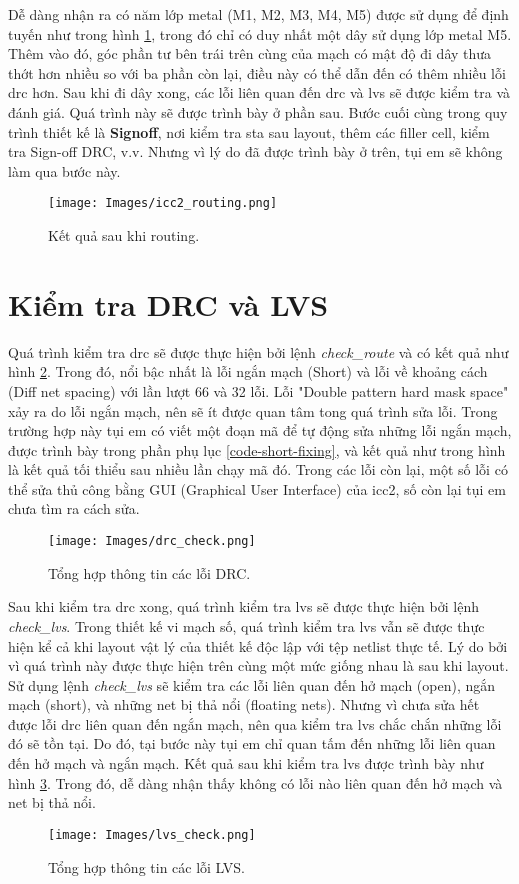 Dễ dàng nhận ra có năm lớp metal (M1, M2, M3, M4, M5) được sử dụng để định tuyến như trong hình \ref{fig:icc2-routing}, trong đó chỉ có duy nhất một dây sử dụng lớp metal M5. Thêm vào đó, góc phần tư bên trái trên cùng của mạch có mật độ đi dây thưa thớt hơn nhiều so với ba phần còn lại, điều này có thể dẫn đến có thêm nhiều lỗi \acrshort{drc} hơn. Sau khi đi dây xong, các lỗi liên quan đến \acrshort{drc} và \acrshort{lvs} sẽ được kiểm tra và đánh giá. Quá trình này sẽ được trình bày ở phần sau. Bước cuối cùng trong quy trình thiết kế là \textbf{Signoff}, nơi kiểm tra \acrshort{sta} sau layout, thêm các filler cell, kiểm tra Sign-off DRC, v.v. Nhưng vì lý do đã được trình bày ở trên, tụi em sẽ không làm qua bước này.

\begin{figure}[htp]
\centering
\captionsetup{justification=centering,margin=2cm}
\texttt{[image: Images/icc2\_routing.png]}
\caption{Kết quả sau khi routing.}
\label{fig:icc2-routing}
\end{figure}

\section{Kiểm tra DRC và LVS}

Quá trình kiểm tra \acrshort{drc} sẽ được thực hiện bởi lệnh \textit{check\_route} và có kết quả như hình \ref{fig:drc-check}. Trong đó, nổi bậc nhất là lỗi ngắn mạch (Short) và lỗi về khoảng cách (Diff net spacing) với lần lượt 66 và 32 lỗi. Lỗi "Double pattern hard mask space" xảy ra do lỗi ngắn mạch, nên sẽ ít được quan tâm tong quá trình sửa lỗi. Trong trường hợp này tụi em có viết một đoạn mã để tự động sửa những lỗi ngắn mạch, được trình bày trong phần phụ lục \ref{code-short-fixing}, và kết quả như trong hình là kết quả tối thiểu sau nhiều lần chạy mã đó. Trong các lỗi còn lại, một số lỗi có thể sửa thủ công bằng GUI (Graphical User Interface) của \acrshort{icc2}, số còn lại tụi em chưa tìm ra cách sửa.

\begin{figure}[htp]
\centering
\captionsetup{justification=centering,margin=2cm}
\texttt{[image: Images/drc\_check.png]}
\caption{Tổng hợp thông tin các lỗi DRC.}
\label{fig:drc-check}
\end{figure}

Sau khi kiểm tra \acrshort{drc} xong, quá trình kiểm tra \acrshort{lvs} sẽ được thực hiện bởi lệnh \textit{check\_lvs}. Trong thiết kế vi mạch số, quá trình kiểm tra \acrshort{lvs} vẫn sẽ được thực hiện kể cả khi layout vật lý của thiết kế độc lập với tệp netlist thực tế. Lý do bởi vì quá trình này được thực hiện trên cùng một mức giống nhau là sau khi layout. Sử dụng lệnh \textit{check\_lvs} sẽ kiểm tra các lỗi liên quan đến hở mạch (open), ngắn mạch (short), và những net bị thả nổi (floating nets). Nhưng vì chưa sửa hết được lỗi \acrshort{drc} liên quan đến ngắn mạch, nên qua kiểm tra \acrshort{lvs} chắc chắn những lỗi đó sẽ tồn tại. Do đó, tại bước này tụi em chỉ quan tấm đến những lỗi liên quan đến hở mạch và ngắn mạch. Kết quả sau khi kiểm tra \acrshort{lvs} được trình bày như hình \ref{fig:lvs-check}. Trong đó, dễ dàng nhận thấy không có lỗi nào liên quan đến hở mạch và net bị thả nổi.

\begin{figure}[htp]
\centering
\captionsetup{justification=centering,margin=2cm}
\texttt{[image: Images/lvs\_check.png]}
\caption{Tổng hợp thông tin các lỗi LVS.}
\label{fig:lvs-check}
\end{figure}